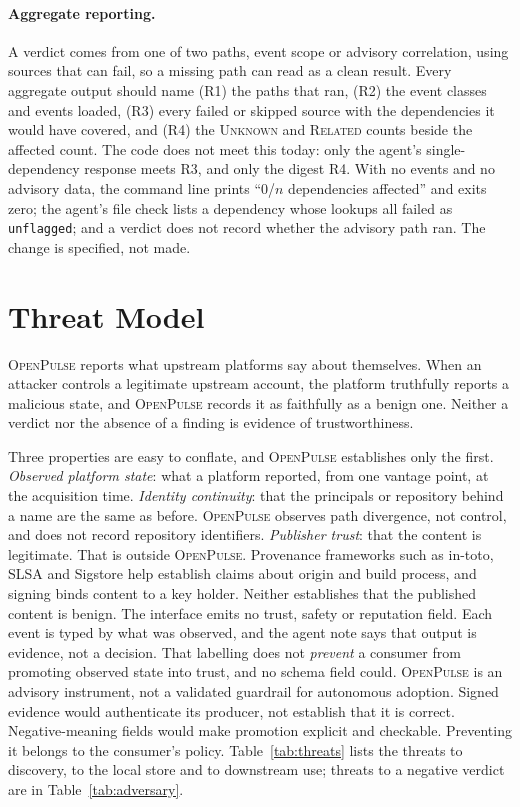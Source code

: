 \documentclass[11pt,a4paper]{article}
\newcommand{\op}{\textsc{OpenPulse}}
\newcommand{\code}[1]{\texttt{#1}}
\begin{document}
\paragraph{Aggregate reporting.} A verdict comes from one of two paths,
event scope or advisory correlation, using sources that can fail, so a
missing path can read as a clean result. Every aggregate output should
name (R1) the paths that ran, (R2) the event classes and events
loaded, (R3) every failed or skipped source with the dependencies it
would have covered, and (R4) the \textsc{Unknown} and \textsc{Related}
counts beside the affected count. The code does not meet this today:
only the agent's single-dependency response meets R3, and only the
digest R4. With no events and no advisory data, the command line
prints ``0/$n$ dependencies affected'' and exits zero; the agent's file
check lists a dependency whose lookups all failed as \code{unflagged};
and a verdict does not record whether the advisory path ran. The change
is specified, not made.

\section{Threat Model}
\label{sec:threat}

\op{} reports what upstream platforms say about themselves. When an
attacker controls a legitimate upstream account, the platform
truthfully reports a malicious state, and \op{} records it as
faithfully as a benign one. Neither a verdict nor the absence of a
finding is evidence of trustworthiness.

Three properties are easy to conflate, and \op{} establishes only the
first. \emph{Observed platform state}: what a platform reported, from
one vantage point, at the acquisition time. \emph{Identity
continuity}: that the principals or repository behind a name are the
same as before. \op{} observes path divergence, not control, and does
not record repository identifiers. \emph{Publisher trust}: that the
content is legitimate. That is outside \op{}. Provenance frameworks such
as in-toto, SLSA and Sigstore help establish claims about origin and
build process, and signing binds content to a key holder. Neither
establishes that the published content is benign. The
interface emits no trust, safety or reputation field. Each event is
typed by what was observed, and the agent note says that output is
evidence, not a decision. That labelling does not \emph{prevent} a
consumer from promoting observed state into trust, and no schema
field could. \op{} is an advisory instrument, not a validated guardrail
for autonomous adoption. Signed evidence would authenticate its
producer, not establish that it is correct. Negative-meaning fields would make promotion explicit and
checkable. Preventing it belongs to the consumer's policy.
Table~\ref{tab:threats} lists the threats to discovery, to the local
store and to downstream use; threats to a negative verdict are in
Table~\ref{tab:adversary}.
\end{document}
